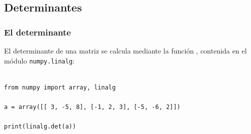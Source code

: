 \subsection{Determinantes}
\begin{frame}[fragile]
\frametitle{El determinante}
El determinante de una matriz se calcula mediante la función , contenida en el módulo \texttt{numpy.linalg}:
\begin{lstlisting}[caption=Cálculo del determinante, style=FormattedNumber, basicstyle=\linespread{1.1}\ttfamily=\small, columns=fullflexible]

from numpy import array, linalg

a = array([[ 3, -5, 8], [-1, 2, 3], [-5, -6, 2]])

print(linalg.det(a))
\end{lstlisting}
\end{frame}
